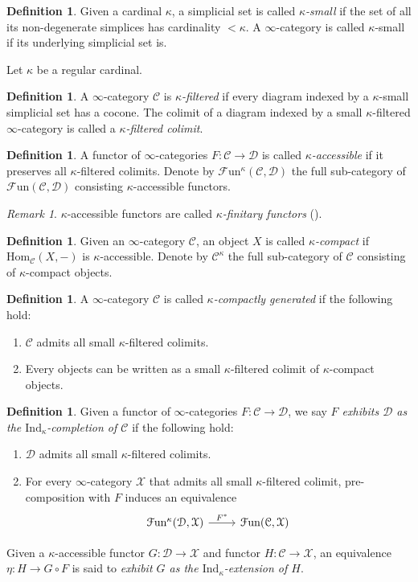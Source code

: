 \documentclass[a4paper]{book}
\newcommand{\lC}{\mathcal{C}}
\newcommand{\lD}{\mathcal{D}}
\newcommand{\lF}{\mathcal{F}}
\newcommand{\lX}{\mathcal{X}}
\newcommand{\Fun}{\lF\mathrm{un}} %
\renewcommand{\hom}{\mathrm{Hom}} %
\newcommand{\Ind}{\mathrm{Ind}} %
\theoremstyle{definition}
\newtheorem{definition}[equation]{Definition}
\theoremstyle{remark}
\newtheorem{remark}[equation]{Remark}
\numberwithin{equation}{section}
\begin{document}
\begin{definition}
	Given a cardinal $\kappa$, a simplicial set is called \emph{$\kappa$-small} if the set of all its non-degenerate simplices has cardinality $<\kappa$. A $\infty$-category is called $\kappa$-small if its underlying simplicial set is. 
\end{definition}
Let $\kappa$ be a regular cardinal. 
\begin{definition}
	A $\infty$-category $\lC$ is \emph{$\kappa$-filtered} if every diagram indexed by a $\kappa$-small simplicial set has a cocone. The colimit of a diagram indexed by a small $\kappa$-filtered $\infty$-category is called a \emph{$\kappa$-filtered colimit}. 
\end{definition}
\begin{definition}
	A functor of $\infty$-categories $F:\lC\to\lD$ is called \emph{$\kappa$-accessible} if it preserves all $\kappa$-filtered colimits. Denote by $\Fun^\kappa(\lC,\lD)$ the full sub-category of $\Fun(\lC,\lD)$ consisting $\kappa$-accessible functors.
\end{definition}
\begin{remark}
	$\kappa$-accessible functors are called \emph{$\kappa$-finitary functors} (\cite[Tag 05Y6]{kerodon2026}). 
\end{remark}
\begin{definition}
	Given an $\infty$-category $\lC$, an object $X$ is called \emph{$\kappa$-compact} if $\hom_\lC(X,-)$ is $\kappa$-accessible. Denote by $\lC^\kappa$ the full sub-category of $\lC$ consisting of $\kappa$-compact objects. 
\end{definition}
\begin{definition}
	A $\infty$-category $\lC$ is called \emph{$\kappa$-compactly generated} if the following hold: 
	\begin{enumerate}
		\item $\lC$ admits all small $\kappa$-filtered colimits. 
		\item Every objects can be written as a small $\kappa$-filtered colimit of $\kappa$-compact objects. 
	\end{enumerate}
\end{definition}
\begin{definition}
	Given  a functor of $\infty$-categories $F:\lC\to\lD$, we say \emph{$F$ exhibits $\lD$ as the $\Ind_\kappa$-completion of $\lC$} if the following hold:
	\begin{enumerate}
		\item $\lD$ admits all small $\kappa$-filtered colimits.
		\item For every $\infty$-category $\lX$ that admits all small $\kappa$-filtered colimit, pre-composition with $F$ induces an equivalence \begin{equation}
			\begin{tikzcd}
				\Fun^\kappa(\lD,\lX) \arrow[r,"F^*"] & \Fun(\lC,\lX)
			\end{tikzcd}
		\end{equation}
	\end{enumerate}
	Given a $\kappa$-accessible functor $G:\lD\to\lX$ and functor $H:\lC\to\lX$, an equivalence $\eta:H\to G\circ F$ is said to \emph{exhibit $G$ as the $\Ind_\kappa$-extension of $H$}.  
\end{definition} 
\end{document}
